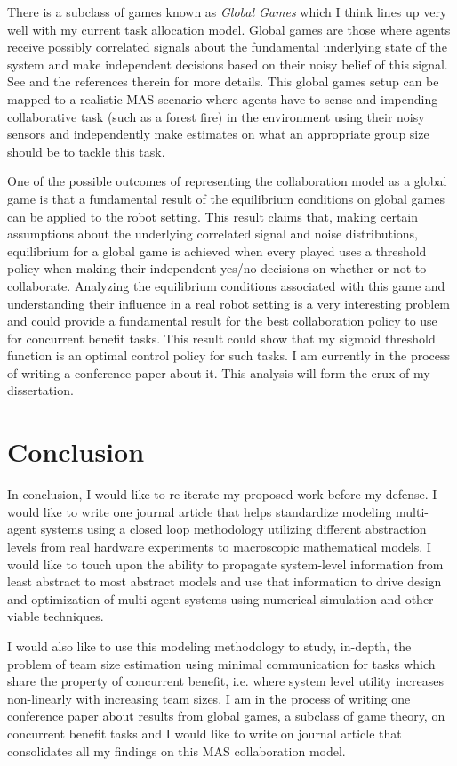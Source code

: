\documentclass[11pt, onecolumn, compsoc, letterpaper]{article}
\begin{document}
There is a subclass of games known as \emph{Global Games} \cite{Carlsson1993, Morris2001} which I think lines up very well with my current task allocation model. Global games are those where agents receive possibly correlated signals about the fundamental underlying state of the system and make independent decisions based on their noisy belief of this signal. See \cite{Morris2001} and the references therein for more details. This global games setup can be mapped to a realistic MAS scenario where agents have to sense and impending collaborative task (such as a forest fire) in the environment using their noisy sensors and independently make estimates on what an appropriate group size should be to tackle this task. 

One of the possible outcomes of representing the collaboration model as a global game is that a fundamental result of the equilibrium conditions on global games can be applied to the robot setting. This result claims that, making certain assumptions about the underlying correlated signal and noise distributions, equilibrium for a global game is achieved when every played uses a threshold policy when making their independent yes/no decisions on whether or not to collaborate. Analyzing the equilibrium conditions associated with this game and understanding their influence in a real robot setting is a very interesting problem and could provide a fundamental result for the best collaboration policy to use for concurrent benefit tasks. This result could show that my sigmoid threshold function is an optimal control policy for such tasks. I am currently in the process of writing a conference paper about it. This analysis will form the crux of my dissertation.

\section{Conclusion}
In conclusion, I would like to re-iterate my proposed work before my defense. I would like to write one journal article that helps standardize modeling multi-agent systems using a closed loop methodology utilizing different abstraction levels from real hardware experiments to macroscopic mathematical models. I would like to touch upon the ability to propagate system-level information from least abstract to most abstract models and use that information to drive design and optimization of multi-agent systems using numerical simulation and other viable techniques. 

I would also like to use this modeling methodology to study, in-depth, the problem of team size estimation using minimal communication for tasks which share the property of concurrent benefit, i.e. where system level utility increases non-linearly with increasing team sizes. I am in the process of writing one conference paper about results from global games, a subclass of game theory, on concurrent benefit tasks and I would like to write on journal article that consolidates all my findings on this MAS collaboration model. 


%


\end{document}

